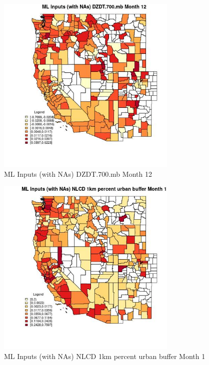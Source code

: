 \begin{figure} 
\centering  
\includegraphics[width=0.77\textwidth]{Code_Outputs/Report_ML_input_PM25_Step4_part_f_de_duplicated_aveswNAs_CountyDZDT700mbmedianMonth12.jpg} 
\caption{\label{fig:Report_ML_input_PM25_Step4_part_f_de_duplicated_aveswNAsCountyDZDT700mbmedianMonth12}ML Inputs (with NAs) DZDT.700.mb Month 12} 
\end{figure} 
 

\clearpage 

\begin{figure} 
\centering  
\includegraphics[width=0.77\textwidth]{Code_Outputs/Report_ML_input_PM25_Step4_part_f_de_duplicated_aveswNAs_CountyNLCD_1km_percent_urban_buffermedianMonth1.jpg} 
\caption{\label{fig:Report_ML_input_PM25_Step4_part_f_de_duplicated_aveswNAsCountyNLCD_1km_percent_urban_buffermedianMonth1}ML Inputs (with NAs) NLCD 1km percent urban buffer Month 1} 
\end{figure} 
 

